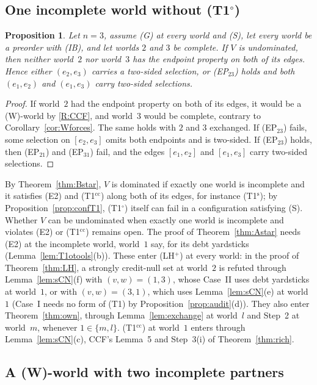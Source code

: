 \documentclass[11pt]{article}
\newtheorem{proposition}[theorem]{Proposition}
\theoremstyle{definition}\newtheorem{definition}[theorem]{Definition}
\theoremstyle{remark}\newtheorem{remark}[theorem]{Remark}
\newcommand{\To}{\textup{(T1$^\circ$)}}
\newcommand{\Ts}{\textup{(T1$^{\mathrm s}$)}}
\newcommand{\Tcc}{\textup{(T1$^{\mathrm{cc}}$)}}
\begin{document}
\subsection{One incomplete world without \texorpdfstring{\To}{(T1o)}}\label{sec:F4}

\begin{proposition}\label{prop:F4}
Let $n=3$, assume (G) at every world and (S), let every world be a preorder
with (IB), and let worlds $2$ and $3$ be complete. If $V$ is undominated,
then neither world~$2$ nor world~$3$ has the endpoint property on both of
its edges. Hence either $(e_2,e_3)$ carries a two-sided selection, or
(EP$_{23}$) holds and both $(e_1,e_2)$ and $(e_1,e_3)$ carry two-sided
selections.
\end{proposition}
\begin{proof}
If world~$2$ had the endpoint property on both of its edges, it would be a
(W)-world by \ref{R:CCF}, and world~$3$ would be complete, contrary to
Corollary~\ref{cor:Wforces}. The same holds with $2$ and $3$ exchanged. If
(EP$_{23}$) fails, some selection on $[e_2,e_3]$ omits both endpoints and
is two-sided. If (EP$_{23}$) holds, then (EP$_{21}$) and (EP$_{31}$) fail,
and the edges $[e_1,e_2]$ and $[e_1,e_3]$ carry two-sided selections.
\end{proof}

By Theorem~\ref{thm:Bstar}, $V$ is dominated if exactly one world is
incomplete and it satisfies (E2) and \Tcc{} along both of its edges, for
instance \Ts; by Proposition~\ref{prop:confT1}, \To{} itself can fail in a
configuration satisfying (S). Whether $V$ can be undominated when exactly
one world is incomplete and violates (E2) or \Tcc{} remains open. The proof
of Theorem~\ref{thm:Astar} needs (E2) at the incomplete world, world~$1$
say, for its debt yardsticks (Lemma~\ref{lem:T1otools}(b)). These enter
(LH$^+$) at every world: in the proof of Theorem~\ref{thm:LH}, a strongly
credit-null set at world~$2$ is refuted through Lemma~\ref{lem:sCN}(f) with
$(v,w)=(1,3)$, whose Case~II uses debt yardsticks at world~$1$, or with
$(v,w)=(3,1)$, which uses Lemma~\ref{lem:sCN}(e) at world~$1$ (Case~I needs
no form of (T1) by Proposition~\ref{prop:audit}(d)). They also enter
Theorem~\ref{thm:own}, through Lemma~\ref{lem:exchange} at world~$l$ and
Step~2 at world~$m$, whenever $1\in\{m,l\}$. \Tcc{} at world~$1$ enters
through Lemma~\ref{lem:sCN}(c), CCF's Lemma~5 and Step~3(i) of
Theorem~\ref{thm:rich}.

\subsection{A (W)-world with two incomplete partners}\label{sec:OW}
\end{document}
